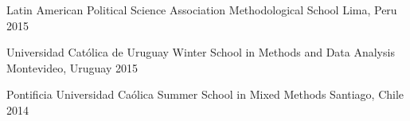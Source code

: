 \vspace{1mm}

\begin{cvhonors}
\cvconf
{Latin American Political Science Association Methodological School}
{Lima, Peru}
{2015}
\end{cvhonors}

\vspace{1mm}

\begin{cvhonors}
\cvconf
{Universidad Cat\'olica de Uruguay Winter School in Methods and Data Analysis}
{Montevideo, Uruguay}
{2015}
\end{cvhonors}

\vspace{1mm}

\begin{cvhonors}
\cvconf
{Pontificia Universidad Ca\'olica Summer School in Mixed Methods}
{Santiago, Chile}
{2014}
\end{cvhonors}

\vspace{1mm}
